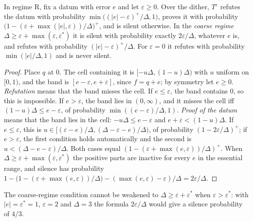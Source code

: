 \begin{lemma}\label{lem:laws:tolerancelaw}
In regime R, fix a datum with error $e$ and let $\varepsilon\ge0$. Over the dither, $T^\varepsilon$ refutes the datum with probability $\min\big((\lvert e\rvert-\varepsilon)^+/\Delta,1\big)$, proves it with probability $\big(1-(\varepsilon+\max(\lvert e\rvert,\varepsilon))/\Delta\big)^+$, and is silent otherwise. In the \emph{coarse regime} $\Delta\ge\varepsilon+\max(\varepsilon,\varepsilon^*)$ it is silent with probability exactly $2\varepsilon/\Delta$, whatever $e$ is, and refutes with probability $(\lvert e\rvert-\varepsilon)^+/\Delta$. For $\varepsilon=0$ it refutes with probability $\min(\lvert e\rvert/\Delta,1)$ and is never silent.
\end{lemma}

\begin{proof}
Place $q$ at $0$. The cell containing it is $[-u\Delta,(1-u)\Delta)$ with $u$ uniform on $[0,1)$, and the band is $[e-\varepsilon,e+\varepsilon]$, since $f=q+e$; by symmetry let $e\ge0$. \emph{Refutation} means that the band misses the cell. If $e\le\varepsilon$, the band contains $0$, so this is impossible. If $e>\varepsilon$, the band lies in $(0,\infty)$, and it misses the cell iff $(1-u)\Delta\le e-\varepsilon$, of probability $\min((e-\varepsilon)/\Delta,1)$. \emph{Proof of the datum} means that the band lies in the cell: $-u\Delta\le e-\varepsilon$ and $e+\varepsilon<(1-u)\Delta$. If $e\le\varepsilon$, this is $u\in[(\varepsilon-e)/\Delta,(\Delta-\varepsilon-e)/\Delta)$, of probability $(1-2\varepsilon/\Delta)^+$; if $e>\varepsilon$, the first condition holds automatically and the second is $u<(\Delta-e-\varepsilon)/\Delta$. Both cases equal $(1-(\varepsilon+\max(e,\varepsilon))/\Delta)^+$. When $\Delta\ge\varepsilon+\max(\varepsilon,\varepsilon^*)$ the positive parts are inactive for every $e$ in the essential range, and silence has probability $1-\big(1-(\varepsilon+\max(e,\varepsilon))/\Delta\big)-(\max(e,\varepsilon)-\varepsilon)/\Delta=2\varepsilon/\Delta$.
\end{proof}

The coarse-regime condition cannot be weakened to $\Delta\ge\varepsilon+\varepsilon^*$ when $\varepsilon>\varepsilon^*$: with $\lvert e\rvert=\varepsilon^*=1$, $\varepsilon=2$ and $\Delta=3$ the formula $2\varepsilon/\Delta$ would give a silence probability of $4/3$.

